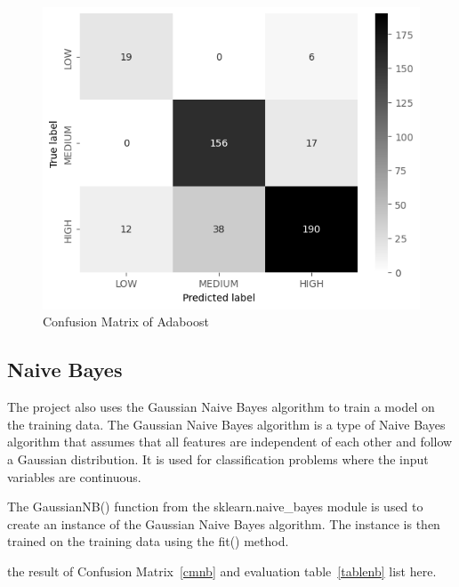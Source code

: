     \begin{figure}[H]
        \includegraphics[scale=0.7]{imgs/adb_cm}
        \centering
        \caption{Confusion Matrix of Adaboost}
        \label{cmadb}
    \end{figure}


\subsection{Naive Bayes}

The project also uses the Gaussian Naive Bayes algorithm to train a model on the training data. The Gaussian Naive Bayes algorithm is a type of Naive Bayes algorithm that assumes that all features are independent of each other and follow a Gaussian distribution. It is used for classification problems where the input variables are continuous.

The GaussianNB() function from the sklearn.naive\_bayes module is used to create an instance of the Gaussian Naive Bayes algorithm. The instance is then trained on the training data using the fit() method.

the result of Confusion Matrix~\ref*{cmnb} and evaluation table~\ref*{tablenb} list here.


